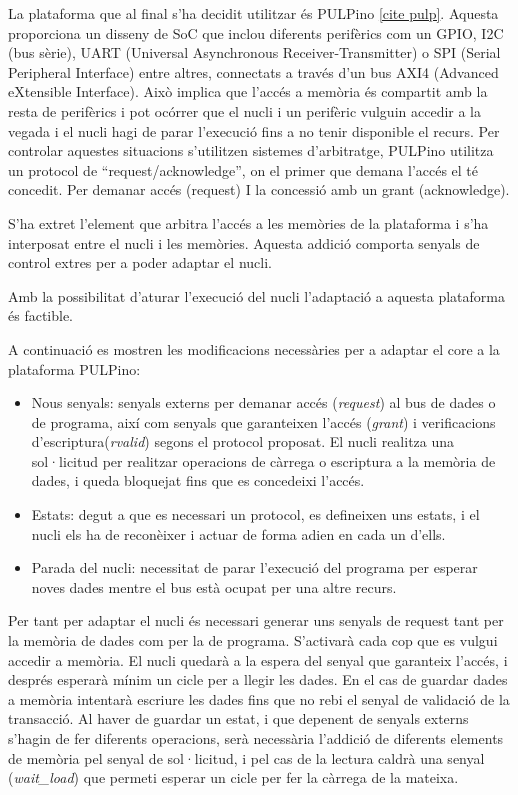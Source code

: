 \documentclass[10pt,a4paper,twocolumn,twoside]{article}
\begin{document}
    La plataforma que al final s'ha decidit utilitzar és PULPino \ref{cite pulp}. Aquesta proporciona un disseny de SoC que inclou diferents perifèrics com un GPIO, I2C (bus sèrie), UART (Universal Asynchronous Receiver-Transmitter) o SPI (Serial Peripheral Interface) entre altres, connectats a través d'un bus AXI4 (Advanced eXtensible Interface). Això implica que l'accés a memòria és compartit amb la resta de perifèrics i pot ocórrer que el nucli i un perifèric vulguin accedir a la vegada i el nucli hagi de parar l'execució fins a no tenir disponible el recurs. Per controlar aquestes situacions s'utilitzen sistemes d'arbitratge, PULPino utilitza un protocol de ``request/acknowledge'', on el primer que demana l’accés el té concedit. Per demanar accés (request) I la concessió amb un grant (acknowledge).  
    
    S'ha extret l'element que arbitra l'accés a les memòries de la plataforma i s'ha interposat entre el nucli i les memòries. Aquesta addició comporta senyals de control extres per a poder adaptar el nucli.
    
    Amb la possibilitat d'aturar l'execució del nucli l'adaptació a aquesta plataforma és factible.
    
    A continuació es mostren les modificacions necessàries per a adaptar el core a la plataforma PULPino:
    \begin{itemize}
        \item Nous senyals: senyals externs per demanar accés (\textit{request}) al bus de dades o de programa, així com senyals que garanteixen l'accés (\textit{grant}) i verificacions d'escriptura(\textit{rvalid}) segons el protocol proposat. El nucli realitza una sol·licitud per realitzar operacions de càrrega o escriptura a la memòria de dades, i queda bloquejat fins que es concedeixi l’accés.
        \item Estats: degut a que es necessari un protocol, es defineixen uns estats, i el nucli els ha de reconèixer i actuar de forma adien en cada un d'ells. 
        \item Parada del nucli: necessitat de parar l'execució del programa per esperar noves dades mentre el bus està ocupat per una altre recurs.

    \end{itemize}
    
    Per tant per adaptar el nucli és necessari generar uns senyals de request tant per la memòria de dades com per la de programa. S'activarà cada cop que es vulgui accedir a memòria. El nucli quedarà a la espera del senyal que garanteix l'accés, i després esperarà mínim un cicle per a llegir les dades. En el cas de guardar dades a memòria  intentarà escriure les dades fins que no rebi el senyal de validació de la transacció.
    Al haver de guardar un estat, i que depenent de senyals externs s’hagin de fer diferents operacions, serà necessària l’addició de diferents elements de memòria pel senyal de sol·licitud, i pel cas de la lectura caldrà una senyal (\textit{wait\_load}) que permeti esperar un cicle per fer la càrrega de la mateixa. 
\end{document}
